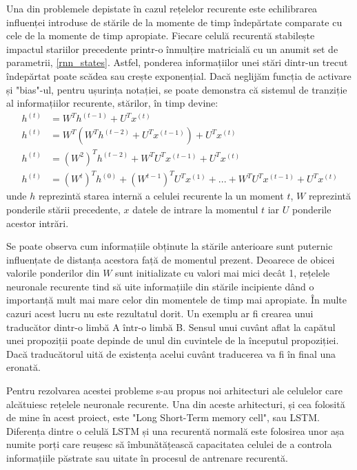 \documentclass[a4paper,12pt]{book}
\begin{document}
				Una din problemele depistate în cazul rețelelor recurente este echilibrarea influenței introduse de stările de la momente de timp îndepărtate comparate cu cele de la momente de timp apropiate. Fiecare celulă recurentă stabilește impactul stariilor precedente printr-o înmulțire matricială cu un anumit set de parametrii, \ref{rnn_states}. Astfel, ponderea informațiilor unei stări dintr-un trecut îndepărtat poate scădea sau crește exponențial. Dacă neglijăm funcția de activare și "bias"-ul, pentru ușurința notației, se poate demonstra că sistemul de tranziție al informațiilor recurente, stărilor, în timp devine:
				\begin{align*}
				h^{(t)} &=  W^Th^{(t-1)} + U^Tx^{(t)}\\				
				h^{(t)} &=  W^T(W^Th^{(t-2)} + U^Tx^{(t-1)}) + U^Tx^{(t)}\\	
				h^{(t)} &= (W^2)^Th^{(t-2)} + W^TU^Tx^{(t-1)} + U^Tx^{(t)}\\	
				h^{(t)} &= (W^t)^Th^{(0)} + (W^{t-1})^TU^Tx^{(1)}+ ...+ W^TU^Tx^{(t-1)} + U^Tx^{(t)}
				\end{align*}
				unde $h$ reprezintă starea internă a celulei recurente la un moment $t$, $W$ reprezintă ponderile stării precedente, $x$ datele de intrare la momentul $t$ iar $U$ ponderile acestor intrări.\par
				Se poate observa cum informațiile obținute la stările anterioare sunt puternic influențate de distanța acestora față de momentul prezent. Deoarece de obicei valorile ponderilor din $W$ sunt initializate cu valori mai mici decât 1, rețelele neuronale recurente tind să uite informațiile din stările incipiente dând o importanță mult mai mare celor din momentele de timp mai apropiate. În multe cazuri acest lucru nu este rezultatul dorit. Un exemplu ar fi crearea unui traducător dintr-o limbă A într-o limbă B. Sensul unui cuvânt aflat la capătul unei propoziții poate depinde de unul din cuvintele de la începutul propoziției. Dacă traducătorul uită de existența acelui cuvânt traducerea va fi în final una eronată.\par
				
				Pentru rezolvarea acestei probleme s-au propus noi arhitecturi ale celulelor care alcătuiesc rețelele neuronale recurente. Una din aceste arhitecturi, și cea folosită de mine în acest proiect, este "Long Short-Term memory cell", sau LSTM. Diferența dintre o celulă LSTM și una recurentă normală este folosirea unor așa numite porți care reușesc să îmbunătățească capacitatea celulei de a controla informațiile păstrate sau uitate în procesul de antrenare recurentă.
				
\end{document}
